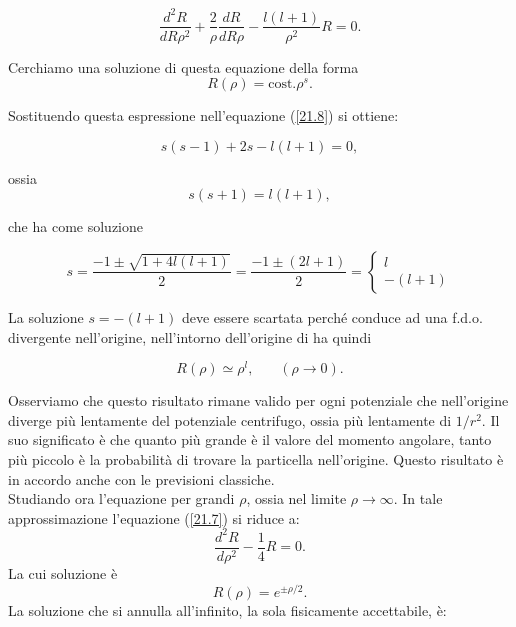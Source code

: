 \documentclass[a4paper,12pt,oneside]{book}
\begin{document}
\begin{equation}
\frac{d^2R}{dR\rho^2}+\frac{2}{\rho}\frac{dR}{dR\rho}-\frac{l\left(l+1\right)}{\rho^2}R=0 .
\label{21.8}
\end{equation}

Cerchiamo una soluzione di questa equazione della forma
\begin{equation}
R\left(\rho\right)=\mbox{cost.} \rho^s .
\end{equation}

Sostituendo questa espressione nell'equazione (\ref{21.8}) si ottiene:

\begin{equation}
s\left(s-1\right)+2s-l\left(l+1\right)=0 ,
\end{equation}

ossia
\begin{equation}
s\left(s+1\right)=l\left(l+1\right) ,
\end{equation}

che ha come soluzione

\begin{equation}
s=\frac{-1\pm\sqrt{1+4l\left(l+1\right)}}{2}=\frac{-1\pm\left(2l+1\right)}{2}=\begin{cases}l\\-\left(l+1\right)\end{cases}
\end{equation}

La soluzione $s=-\left(l+1\right)$ deve essere scartata perché  conduce ad una f.d.o. divergente nell'origine, nell'intorno dell'origine di ha quindi

\begin{equation}
R\left(\rho\right)\simeq\rho^l , \ \ \ \ \ \ \ \ \left(\rho\rightarrow0\right) .
\end{equation}

Osserviamo che questo risultato rimane valido per ogni potenziale che nell'origine diverge più lentamente del potenziale centrifugo, ossia più lentamente di $1/r^2$. Il suo significato è che quanto più grande è il valore del momento angolare, tanto più piccolo è la probabilità di trovare la particella nell'origine.
Questo risultato è in accordo anche con le previsioni classiche.\\
Studiando ora l'equazione per grandi $\rho$, ossia nel limite $\rho\rightarrow\infty$. In tale approssimazione l'equazione (\ref{21.7}) si riduce a:
\begin{equation}
\frac{d^2R}{d\rho^2}-\frac{1}{4}R=0 .
\end{equation}
La cui soluzione è
\begin{equation}
R\left(\rho\right)=e^{\pm\rho/2} . 
\end{equation}
La soluzione che si annulla all'infinito, la sola fisicamente accettabile, è:
 
\end{document}
